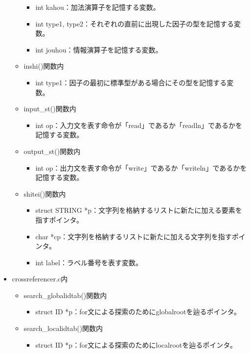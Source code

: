 \documentclass{jarticle}
\begin{document}
\begin{itemize}
\begin{itemize}
\begin{itemize}
      \item int kahou：加法演算子を記憶する変数。
    \end{itemize}
    \begin{itemize}
      \item int type1, type2：それぞれの直前に出現した因子の型を記憶する変数。
      \item int jouhou：情報演算子を記憶する変数。
    \end{itemize}
    \item inshi()関数内
    \begin{itemize}
      \item int type1：因子の最初に標準型がある場合にその型を記憶する変数。
    \end{itemize}
    \item input\_st()関数内
    \begin{itemize}
      \item int op：入力文を表す命令が「read」であるか「readln」であるかを記憶する変数。
    \end{itemize}
    \item output\_st()関数内
    \begin{itemize}
      \item int op：出力文を表す命令が「write」であるか「writeln」であるかを記憶する変数。
    \end{itemize}
    \item shitei()関数内
    \begin{itemize}
      \item struct STRING *p：文字列を格納するリストに新たに加える要素を指すポインタ。
      \item char *cp：文字列を格納するリストに新たに加える文字列を指すポインタ。
      \item int label：ラベル番号を表す変数。
    \end{itemize}
  \end{itemize}
  \item crossreferencer.c内
  \begin{itemize}
    \item search\_globalidtab()関数内
    \begin{itemize}
      \item struct ID *p：for文による探索のためにglobalrootを辿るポインタ。
    \end{itemize}
    \item search\_localidtab()関数内
    \begin{itemize}
      \item struct ID *p：for文による探索のためにlocalrootを辿るポインタ。

\end{itemize}
\end{itemize}
\end{itemize}
\end{document}
